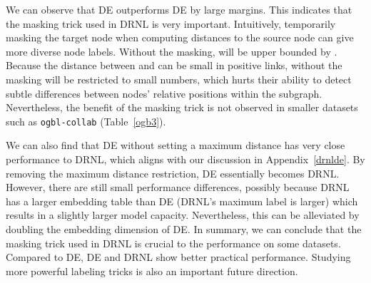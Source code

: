 \documentclass{article}
\begin{document}
\begin{table}[h]
\caption{Comparison of DE,  and DRNL.}
\label{table:de}
\begin{center}
\end{center}
\end{table}

We can observe that DE outperforms DE by large margins. This indicates that the masking trick used in DRNL is very important. Intuitively, temporarily masking the target node  when computing distances to the source node  can give more diverse node labels. Without the masking,  will be upper bounded by . Because the distance between  and  can be small in positive links, without the masking  will be restricted to small numbers, which hurts their ability to detect subtle differences between nodes' relative positions within the subgraph. Nevertheless, the benefit of the masking trick is not observed in smaller datasets such as \texttt{ogbl-collab} (Table~\ref{ogb3}). 

We can also find that DE without setting a maximum distance has very close performance to DRNL, which aligns with our discussion in Appendix~\ref{drnlde}. By removing the maximum distance restriction, DE essentially becomes DRNL. However, there are still small performance differences, possibly because DRNL has a larger embedding table than DE (DRNL's maximum label is larger) which results in a slightly larger model capacity. Nevertheless, this can be alleviated by doubling the embedding dimension of DE. In summary, we can conclude that the masking trick used in DRNL is crucial to the performance on some datasets. Compared to DE, DE and DRNL show better practical performance. Studying more powerful labeling tricks is also an important future direction.
\end{document}
